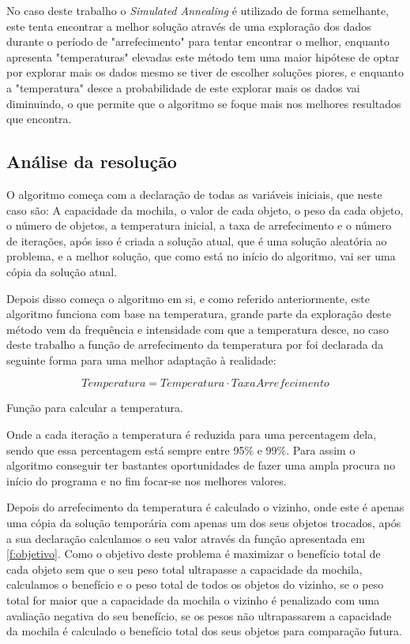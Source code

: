 No caso deste trabalho o \textit{Simulated Annealing} é utilizado de forma semelhante, este tenta encontrar a melhor solução através de uma exploração dos dados durante o período de "arrefecimento" para tentar encontrar o melhor, enquanto apresenta "temperaturas" elevadas este método tem uma maior hipótese de optar por explorar mais os dados mesmo se tiver de escolher soluções piores, e enquanto a "temperatura" desce a probabilidade de este explorar mais os dados vai diminuindo, o que permite que o algoritmo se foque mais nos melhores resultados que encontra.



\subsection{Análise da resolução}

O algoritmo começa com a declaração de todas as variáveis iniciais, que neste caso são: A capacidade da mochila, o valor de cada objeto, o peso da cada objeto, o número de objetos, a temperatura inicial, a taxa de arrefecimento e o número de iterações, após isso é criada a solução atual, que é uma solução aleatória ao problema, e a melhor solução, que como está no início do algoritmo, vai ser uma cópia da solução atual. 

Depois disso começa o algoritmo em si, e como referido anteriormente, este algoritmo funciona com base na temperatura, grande parte da exploração deste método vem da frequência e intensidade com que a temperatura desce, no caso deste trabalho a função de arrefecimento da temperatura por foi declarada da seguinte forma para uma melhor adaptação à realidade:

\begin{mycapequ}[!ht]
\begin{equation}
\label{f:temp}
    Temperatura = Temperatura \cdot TaxaArrefecimento
\end{equation}
  \caption{Função para calcular a temperatura.}
\end{mycapequ}

Onde a cada iteração a temperatura é reduzida para uma percentagem dela, sendo que essa percentagem está sempre entre 95\% e 99\%. Para assim o algoritmo conseguir ter bastantes oportunidades de fazer uma ampla procura no início do programa e no fim focar-se nos melhores valores. 

Depois do arrefecimento da temperatura é calculado o vizinho, onde este é apenas uma cópia da solução temporária com apenas um dos seus objetos trocados, após a sua declaração calculamos o seu valor através da função apresentada em \ref{f:objetivo}. Como o objetivo deste problema é maximizar o benefício total de cada objeto sem que o seu peso total ultrapasse a capacidade da mochila, calculamos o benefício e o peso total de todos os objetos do vizinho, se o peso total for maior que a capacidade da mochila o vizinho é penalizado com uma avaliação negativa do seu benefício, se os pesos não ultrapassarem a capacidade da mochila é calculado o benefício total dos seus objetos para comparação futura.

